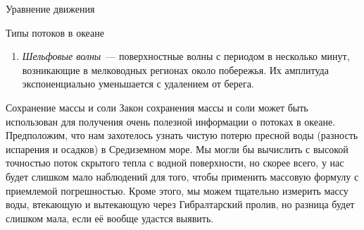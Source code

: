 \begin{chapter}{Уравнение движения}
\begin{section}{Типы потоков в океане}
\begin{enumerate}

\item
\emph{Шельфовые волны}~--- поверхностные волны с периодом в несколько минут, 
возникающие в мелководных регионах около побережья. Их амплитуда 
экспоненциально уменьшается с удалением от берега.
%
\end{enumerate}
\end{section}

\begin{section}{Сохранение массы и соли}
Закон сохранения массы и соли может быть использован для получения
очень полезной информации о потоках в океане. Предположим,
что нам захотелось узнать чистую потерю пресной воды (разность испарения и
осадков) в Средиземном море. Мы могли бы вычислить с высокой точностью поток
скрытого тепла с водной поверхности, но скорее всего, у нас будет слишком
мало наблюдений для того, чтобы применить массовую формулу с приемлемой 
погрешностью. Кроме этого, мы можем тщательно измерить массу воды, 
втекающую и вытекающую через Гибралтарский пролив, но разница будет 
слишком мала, если её вообще удастся выявить.
%


\end{section}
\end{chapter}
